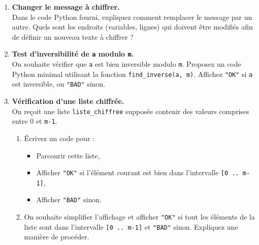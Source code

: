 \documentclass[12pt,a4paper]{article}
\begin{document}
\begin{enumerate}

  \item \textbf{Changer le message à chiffrer.}\\
  Dans le code Python fourni, expliquez comment remplacer le message par un autre.  
  Quels sont les endroits (variables, lignes) qui doivent être modifiés afin de définir un nouveau texte à chiffrer ?


  \item \textbf{Test d'inversibilité de \texttt{a} modulo \texttt{m}.}\\
  On souhaite vérifier que \texttt{a} est bien inversible modulo \texttt{m}.  
  Proposez un code Python minimal utilisant la fonction \texttt{find\_inverse(a, m)}.  
  Affichez \texttt{"OK"} si \texttt{a} est inversible, ou \texttt{"BAD"} sinon.

  \item \textbf{Vérification d'une liste chiffrée.}\\
  On reçoit une liste \verb|liste_chiffree| supposée contenir des valeurs comprises entre 0 et \texttt{m-1}.
  \begin{enumerate}
    \item Écrivez un code pour :
      \begin{itemize}
        \item Parcourir cette liste,
        \item Afficher \texttt{"OK"} si l'élément courant est bien dans l'intervalle \texttt{[0 .. m-1]},
        \item Afficher \texttt{"BAD"} sinon.
      \end{itemize}
    \item On souhaite simplifier l'affichage et afficher \texttt{"OK"} si tout les éléments de la liste sont dans l'intervalle \texttt{[0 .. m-1]} et \texttt{"BAD"} sinon. Expliquez une manière de procéder.
  \end{enumerate}



\end{enumerate}
\end{document}
